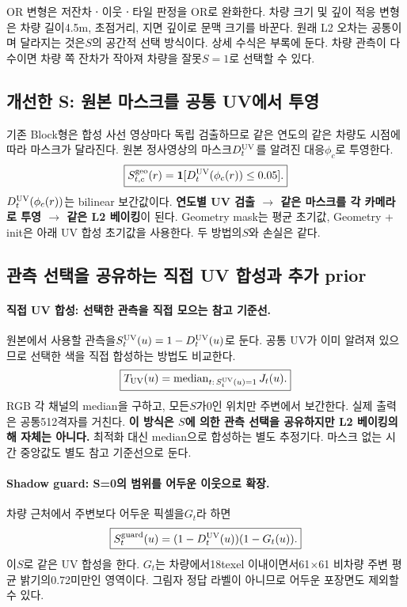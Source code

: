 \documentclass[11pt,a4paper]{article}
\newcommand{\ind}{\mathbf{1}}
\newcommand{\med}{\operatorname{median}}
\begin{document}
OR 변형은 저잔차ㆍ이웃ㆍ타일 판정을 OR로 완화한다. 차량 크기 및 깊이 적응 변형은 차량 길이4.5m, 초점거리, 지면 깊이로 문맥 크기를 바꾼다. 원래 L2 오차는 공통이며 달라지는 것은$S$의 공간적 선택 방식이다. 상세 수식은 부록에 둔다. 차량 관측이 다수이면 차량 쪽 잔차가 작아져 차량을 잘못$S=1$로 선택할 수 있다.

\subsection{개선한 S: 원본 마스크를 공통 UV에서 투영}
기존 Block형은 합성 사선 영상마다 독립 검출하므로 같은 연도의 같은 차량도 시점에 따라 마스크가 달라진다. 원본 정사영상의 마스크$D_t^{\rm UV}$를 알려진 대응$\phi_c$로 투영한다.
\begin{equation}
 \boxed{S_{t,c}^{\rm geo}(r)=\ind[D_t^{\rm UV}(\phi_c(r))\le0.05].}
\end{equation}
$D_t^{\rm UV}(\phi_c(r))$는 bilinear 보간값이다. \textbf{연도별 UV 검출 $\rightarrow$ 같은 마스크를 각 카메라로 투영 $\rightarrow$ 같은 L2 베이킹}이 된다. Geometry mask는 평균 초기값, Geometry + init은 아래 UV 합성 초기값을 사용한다. 두 방법의$S$와 손실은 같다.

\subsection{관측 선택을 공유하는 직접 UV 합성과 추가 prior}
\paragraph{직접 UV 합성: 선택한 관측을 직접 모으는 참고 기준선.}
원본에서 사용할 관측을$S_t^{\rm UV}(u)=1-D_t^{\rm UV}(u)$로 둔다. 공통 UV가 이미 알려져 있으므로 선택한 색을 직접 합성하는 방법도 비교한다.
\begin{equation}
 \boxed{T_{\rm UV}(u)=\med_{t:\,S_t^{\rm UV}(u)=1}J_t(u).}
\end{equation}
RGB 각 채널의 median을 구하고, 모든$S$가0인 위치만 주변에서 보간한다. 실제 출력은 공통512격자를 거친다. \textbf{이 방식은 $S$에 의한 관측 선택을 공유하지만 L2 베이킹의 해 자체는 아니다.} 최적화 대신 median으로 합성하는 별도 추정기다. 마스크 없는 시간 중앙값도 별도 참고 기준선으로 둔다.

\paragraph{Shadow guard: S=0의 범위를 어두운 이웃으로 확장.}
차량 근처에서 주변보다 어두운 픽셀을$G_t$라 하면
\begin{equation}
 \boxed{S_t^{\rm guard}(u)=(1-D_t^{\rm UV}(u))(1-G_t(u)).}
\end{equation}
이$S$로 같은 UV 합성을 한다. $G_t$는 차량에서18texel 이내이면서61$\times$61 비차량 주변 평균 밝기의0.72미만인 영역이다. 그림자 정답 라벨이 아니므로 어두운 포장면도 제외할 수 있다.
\end{document}
